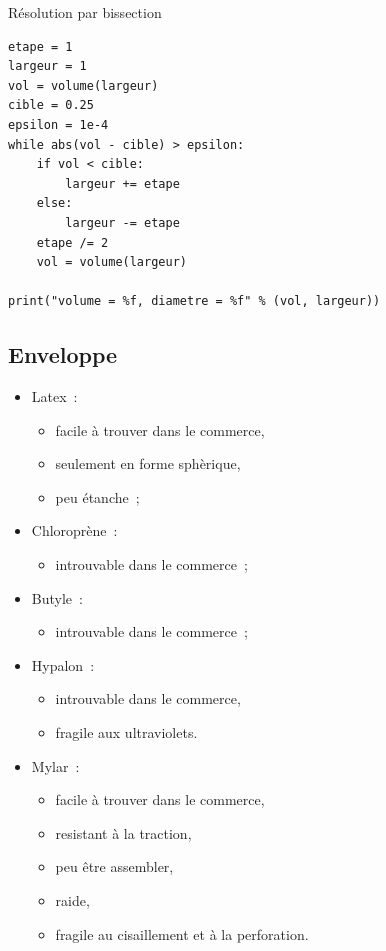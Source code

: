 \documentclass{beamer}
\begin{document}
\begin{frame}[fragile]{Résolution par bissection}
  \begin{lstlisting}[frame=single]
etape = 1
largeur = 1
vol = volume(largeur)
cible = 0.25
epsilon = 1e-4
while abs(vol - cible) > epsilon:
	if vol < cible:
		largeur += etape
	else:
		largeur -= etape
	etape /= 2
	vol = volume(largeur)

print("volume = %f, diametre = %f" % (vol, largeur))
  \end{lstlisting}
\end{frame}

\subsection{Enveloppe}

\begin{frame}
  \begin{multicols}{2}
    \begin{itemize}
      \item Latex~:
      \begin{itemize}
        \item facile à trouver dans le commerce,
        \item seulement en forme sphèrique,
        \item peu étanche~;
      \end{itemize}
      \item Chloroprène~:
      \begin{itemize}
        \item introuvable dans le commerce~;
      \end{itemize}
      \item Butyle~:
      \begin{itemize}
        \item introuvable dans le commerce~;
      \end{itemize}
      \item Hypalon~:
      \begin{itemize}
        \item introuvable dans le commerce,
        \item fragile aux ultraviolets.
      \end{itemize}
    \end{itemize}
    \newpage
    \begin{itemize}
      \item Mylar~:
      \begin{itemize}
        \item facile à trouver dans le commerce,
        \item resistant à la traction,
        \item peu être assembler,
        \item raide,
        \item fragile au cisaillement et à la perforation.
      \end{itemize}
    \end{itemize}
  \end{multicols}
\end{frame}
\end{document}

